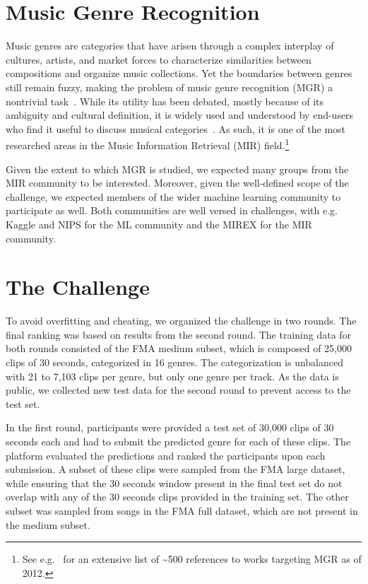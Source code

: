 \documentclass[sigconf]{acmart}
\begin{document}
\section{Music Genre Recognition}

Music genres are categories that have arisen through a complex interplay of cultures, artists, and market forces to characterize similarities between compositions and organize music collections. Yet the boundaries between genres still remain fuzzy, making the problem of music genre recognition (MGR) a nontrivial task~\cite{mir_review_genre}. While its utility has been debated, mostly because of its ambiguity and cultural definition, it is widely used and understood by end-users who find it useful to discuss musical categories~\cite{mgr_why}. As such, it is one of the most researched areas in the Music Information Retrieval (MIR) field.\footnote{See e.g.\ \cite{mgr_eval_1} for an extensive list of \textasciitilde500 references to works targeting MGR as of 2012.}

Given the extent to which MGR is studied, we expected many groups from the MIR community to be interested. Moreover, given the well-defined scope of the challenge, we expected members of the wider machine learning community to participate as well. Both communities are well versed in challenges, with e.g. Kaggle and NIPS for the ML community and the MIREX for the MIR community.

\section{The Challenge}

To avoid overfitting and cheating, we organized the challenge in two rounds. The final ranking was based on results from the second round.
The training data for both rounds consisted of the FMA medium subset, which is composed of 25,000 clips of 30 seconds, categorized in 16 genres. The categorization is unbalanced with 21 to 7,103 clips per genre, but only one genre per track. As the data is public, we collected new test data for the second round to prevent access to the test set.

In the first round, participants were provided a test set of 30,000 clips of 30 seconds each and had to submit the predicted genre for each of these clips. The platform evaluated the predictions and ranked the participants upon each submission. A subset of these clips were sampled from the FMA large dataset, while ensuring that the 30 seconds window present in the final test set do not overlap with any of the 30 seconds clips provided in the training set. The other subset was sampled from songs in the FMA full dataset, which are not present in the medium subset.
\end{document}
